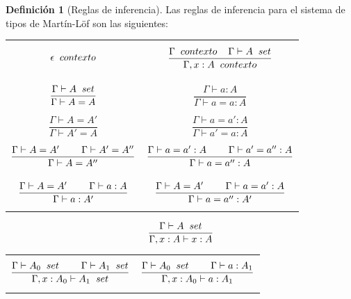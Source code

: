 \documentclass[11pt,oneside]{report}
\theoremstyle{plain}
\theoremstyle{definition}
\newtheorem{defi}{Definición}[chapter]
\begin{document}
\begin{defi}[Reglas de inferencia]
    Las reglas de inferencia para el sistema de tipos de Martín-Löf son las siguientes:
    \begin{center}
        \begin{tabular}{p{6cm}p{6cm}}
            $$\epsilon \hspace{2mm} contexto$$
                                                        &
            $$\frac{\Gamma\hspace{2mm} contexto \hspace{4mm} \Gamma \vdash A \hspace{2mm} set}{\Gamma,x:A \hspace{2mm} contexto}$$ \\

            $$\frac{\Gamma \vdash A \hspace{2mm} set}{\Gamma \vdash A = A}$$
                                                        &
            $$\frac{\Gamma \vdash a : A}{\Gamma \vdash a = a : A}$$                                               \\

            $$\frac{\Gamma \vdash A = A'}{\Gamma \vdash A' = A}$$ &
            $$\frac{\Gamma \vdash a = a' : A}{\Gamma \vdash a' = a : A}$$                                         \\

            $$\frac{\Gamma \vdash A = A' \hspace{8mm} \Gamma \vdash A' = A''}{\Gamma \vdash A = A''}$$
                                                        &
            $$\frac{\Gamma \vdash a = a' : A \hspace{8mm} \Gamma \vdash a' = a'' : A}{\Gamma \vdash a = a'' : A}$$     \\
            $$\frac{\Gamma \vdash A = A' \hspace{8mm} \Gamma \vdash a : A}{\Gamma \vdash a : A'}$$
                                                        &
            $$\frac{\Gamma \vdash A = A' \hspace{8mm} \Gamma \vdash a = a' : A}{\Gamma \vdash a = a'' : A'}$$          \\
        \end{tabular}

        $$\frac{\Gamma\vdash A \hspace{2mm} set}{\Gamma, x:A \vdash x:A}$$

        \begin{tabular}{p{7cm}p{7cm}}
            $$\frac{\Gamma\vdash A_{0} \hspace{2mm} set \hspace{8mm} \Gamma\vdash A_{1} \hspace{2mm} set}{\Gamma, x:A_{0} \vdash A_{1} \hspace{2mm}set}$$
             &
            $$\frac{\Gamma\vdash A_{0} \hspace{2mm} set \hspace{8mm} \Gamma\vdash a:A_{1}}{\Gamma, x:A_{0} \vdash a:A_{1}}$$ \\
        \end{tabular}


\end{center}
\end{defi}
\end{document}
